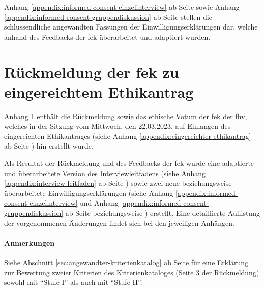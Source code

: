 \documentclass[a4paper,12pt,twoside]{scrreprt}
\begin{document}
\medskip

Anhang \ref{appendix:informed-consent-einzelinterview} ab Seite \pageref{appendix:informed-consent-einzelinterview} sowie Anhang \ref{appendix:informed-consent-gruppendiskussion} ab Seite \pageref{appendix:informed-consent-gruppendiskussion} stellen die schlussendliche angewandten Fassungen der Einwilligungserklärungen dar, welche anhand des Feedbacks der \ac{fek} überarbeitet und adaptiert wurden.



\chapter{Rückmeldung der \acs{fek} zu eingereichtem Ethikantrag}
\label{appendix:rückmeldung-fek}

Anhang \ref{appendix:rückmeldung-fek} enthält die Rückmeldung sowie das ethische Votum der \acl{fek} der \acl{fhv}, welches in der Sitzung vom Mittwoch, den 22.03.2023, auf Einlangen des eingereichten Ethikantrages (siehe Anhang \ref{appendix:eingereichter-ethikantrag} ab Seite \pageref{appendix:eingereichter-ethikantrag}) hin erstellt wurde.

\medskip

Als Resultat der Rückmeldung und des Feedbacks der \ac{fek} wurde eine adaptierte und überarbeitete Version des Interviewleitfadens (siehe Anhang \ref{appendix:interview-leitfaden} ab Seite \pageref{appendix:interview-leitfaden}) sowie zwei neue beziehungsweise überarbeitete Einwilligungserklärungen (siehe Anhang \ref{appendix:informed-consent-einzelinterview} und Anhang \ref{appendix:informed-consent-gruppendiskussion} ab Seite \pageref{appendix:informed-consent-einzelinterview} beziehungsweise \pageref{appendix:informed-consent-gruppendiskussion}) erstellt. Eine detaillierte Auflistung der vorgenommenen Änderungen findet sich bei den jeweiligen Anhängen.

\subsubsection*{Anmerkungen}
\label{appendix:anmerkungen-rückmeldung-fek}

Siehe Abschnitt \ref{sec:angewandter-kriterienkatalog} ab Seite \pageref{sec:angewandter-kriterienkatalog} für eine Erklärung zur Bewertung zweier Kriterien des Kriterienkataloges (Seite 3 der Rückmeldung) sowohl mit \enquote{Stufe I} als auch mit \enquote{Stufe II}.
\end{document}

